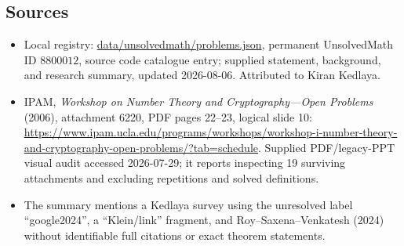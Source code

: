 \documentclass[11pt]{article}
\begin{document}
\subsection{Sources}
\begin{itemize}
\item Local registry: \url{data/unsolvedmath/problems.json}, permanent UnsolvedMath ID \(8800012\), source code catalogue entry; supplied statement, background, and research summary, updated 2026-08-06. Attributed to Kiran Kedlaya.
\item IPAM, \emph{Workshop on Number Theory and Cryptography---Open Problems} (2006), attachment 6220, PDF pages 22--23, logical slide 10: \url{https://www.ipam.ucla.edu/programs/workshops/workshop-i-number-theory-and-cryptography-open-problems/?tab=schedule}. Supplied PDF/legacy-PPT visual audit accessed 2026-07-29; it reports inspecting 19 surviving attachments and excluding repetitions and solved definitions.
\item The summary mentions a Kedlaya survey using the unresolved label ``google2024'', a ``Klein/link'' fragment, and Roy--Saxena--Venkatesh (2024) without identifiable full citations or exact theorem statements.
\end{itemize}
\end{document}
